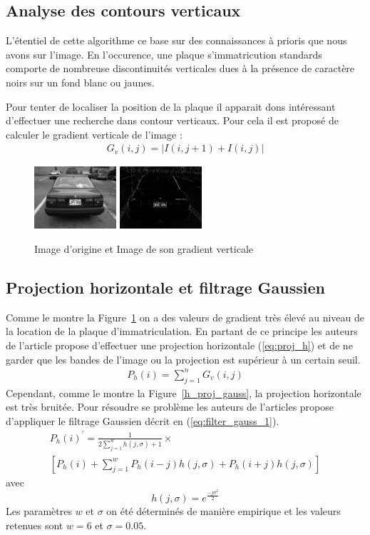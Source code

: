 \documentclass[a4paper,10pt,twocolumn]{article}
\begin{document}
\subsection{Analyse des contours verticaux}
L'étentiel de cette algorithme ce base sur des connaissances à prioris que nous avons sur l'image. En l'occurence, une plaque s'immatricution standards comporte de nombreuse discontinuités verticales dues à la présence de caractère noirs sur un fond blanc ou jaunes.

Pour tenter de localiser la position de la plaque il apparait dons intéressant d'effectuer une recherche dans contour verticaux. Pour cela il est proposé de calculer le gradient verticale de l'image :
\begin{align}
  G_v(i, j) = |I(i, j + 1) + I(i, j)|
\end{align}
\begin{figure}[H]
	\centering 
	  \includegraphics[width=115px]{img/991213-006.png}
	  \includegraphics[width=115px]{img/991213-006_grad.png}
	\caption{Image d'origine et Image de son gradient verticale\label{grad}}
\end{figure}

\subsection{Projection horizontale et filtrage Gaussien}
Comme le montre la Figure~\ref{grad} on a des valeurs de gradient très élevé au niveau de la location de la plaque d'immatriculation. En partant de ce principe les auteurs de l'article propose d'effectuer une projection horizontale (\ref{eq:proj_h}) et de ne garder que les bandes de l'image ou la projection est supérieur à un certain seuil.
\begin{align} \label{eq:proj_h}
  P_h(i) = \sum_{j=1}^{n}G_v(i, j)
\end{align}
Cependant, comme le montre la Figure~\ref{h_proj_gauss}, la projection horizontale est très bruitée. Pour résoudre se problème les auteurs de l'articles propose d'appliquer le filtrage Gaussien décrit en (\ref{eq:filter_gauss_1}).
\begin{gather} \label{eq:filter_gauss_1}
  P_h(i)^{\prime} = \frac{1}{2 \sum_{j = 1}^{w} h(j, \sigma) + 1} \times\\ 
  \left[ P_h(i) + \sum_{j = 1}^{w} P_h(i - j)h(j, \sigma) + P_h(i + j)h(j, \sigma) \right]\nonumber
\end{gather}
avec 
\[ h(j, \sigma) = e^{\frac{-j\sigma^2}{2}} \]
Les paramètres $w$ et $\sigma$ on été déterminés de manière empirique et les valeurs retenues sont $w = 6$ et $\sigma = 0.05$.
\end{document}

